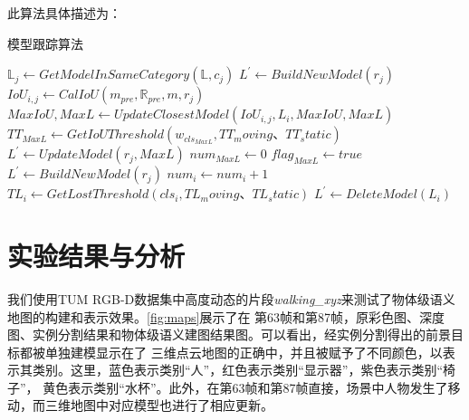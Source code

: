 此算法具体描述为：
\begin{algorithm} %
    \small
    \caption{模型跟踪算法} \label{alg1} %
    \begin{algorithmic}[1] %
        \State $\mathbb{L}_{j}\gets GetModelInSameCategory(\mathbb{L},c_{j})$
            \State $L^{'}\gets BuildNewModel(r_{j})$
        \Else
                \State $IoU_{i,j}\gets CalIoU(m_{pre},\mathbb{R}_{pre},m,r_{j})$
                \State $MaxIoU, MaxL\gets UpdateClosestModel(IoU_{i,j},L_{i},MaxIoU, MaxL)$
            \EndFor
            \State $TT_{MaxL}\gets GetIoUThreshold(w_{cls_{MaxL}},TT_moving、TT_static)$
                \State $L^{'}\gets UpdateModel(r_{j},MaxL)$
                \State $num_{MaxL}\gets 0$
                \State $flag_{MaxL}\gets true$
            \Else
                \State $L^{'}\gets BuildNewModel(r_{j})$
            \EndIf
        \EndIf
    \EndFor
            \State $num_{i}\gets num_{i}+1$
        \EndIf
    \EndFor
        \State $TL_{i}\gets GetLostThreshold(cls_{i},TL_moving、TL_static)$
            \State $L^{'}\gets DeleteModel(L_{i})$
        \EndIf
    \EndFor
    \EndProcedure
    \end{algorithmic} 
\end{algorithm}

\section{实验结果与分析}
我们使用TUM RGB-D数据集中高度动态的片段\emph{walking\_xyz}来测试了物体级语义地图的构建和表示效果。\ref{fig:maps}展示了在
第63帧和第87帧，原彩色图、深度图、实例分割结果和物体级语义建图结果图。可以看出，经实例分割得出的前景目标都被单独建模显示在了
三维点云地图的正确中，并且被赋予了不同颜色，以表示其类别。这里，蓝色表示类别“人”，红色表示类别“显示器”，紫色表示类别“椅子”，
黄色表示类别“水杯”。此外，在第63帧和第87帧直接，场景中人物发生了移动，而三维地图中对应模型也进行了相应更新。

